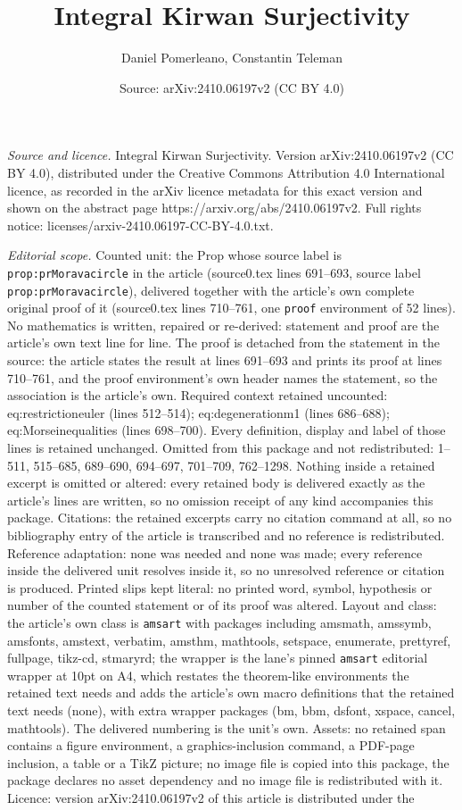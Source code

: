 \documentclass[10pt,a4paper]{amsart}
\title[Integral Kirwan Surjectivity]{Integral Kirwan Surjectivity}
\author{Daniel Pomerleano, Constantin Teleman}
\date{Source: arXiv:2410.06197v2 (CC BY 4.0)}
\begin{document}
\maketitle

\noindent\emph{Source and licence.} Integral Kirwan Surjectivity. Version arXiv:2410.06197v2 (CC BY 4.0), distributed under the Creative Commons Attribution 4.0 International licence, as recorded in the arXiv licence metadata for this exact version and shown on the abstract page https://arxiv.org/abs/2410.06197v2. Full rights notice: licenses/arxiv-2410.06197-CC-BY-4.0.txt.\par\smallskip

\noindent\textit{Editorial scope.} Counted unit: the Prop whose source label is \texttt{prop:prMoravacircle} in the article (source0.tex lines 691--693, source label \texttt{prop:prMoravacircle}), delivered together with the article's own complete original proof of it (source0.tex lines 710--761, one \texttt{proof} environment of 52 lines). No mathematics is written, repaired or re-derived: statement and proof are the article's own text line for line. The proof is detached from the statement in the source: the article states the result at lines 691--693 and prints its proof at lines 710--761, and the proof environment's own header names the statement, so the association is the article's own. Required context retained uncounted: eq:restrictioneuler (lines 512--514); eq:degenerationm1 (lines 686--688); eq:Morseinequalities (lines 698--700). Every definition, display and label of those lines is retained unchanged. Omitted from this package and not redistributed: 1--511, 515--685, 689--690, 694--697, 701--709, 762--1298. Nothing inside a retained excerpt is omitted or altered: every retained body is delivered exactly as the article's lines are written, so no omission receipt of any kind accompanies this package. Citations: the retained excerpts carry no citation command at all, so no bibliography entry of the article is transcribed and no reference is redistributed. Reference adaptation: none was needed and none was made; every reference inside the delivered unit resolves inside it, so no unresolved reference or citation is produced. Printed slips kept literal: no printed word, symbol, hypothesis or number of the counted statement or of its proof was altered. Layout and class: the article's own class is \texttt{amsart} with packages including amsmath, amssymb, amsfonts, amstext, verbatim, amsthm, mathtools, setspace, enumerate, prettyref, fullpage, tikz-cd, stmaryrd; the wrapper is the lane's pinned \texttt{amsart} editorial wrapper at 10pt on A4, which restates the theorem-like environments the retained text needs and adds the article's own macro definitions that the retained text needs (none), with extra wrapper packages (bm, bbm, dsfont, xspace, cancel, mathtools). The delivered numbering is the unit's own. Assets: no retained span contains a figure environment, a graphics-inclusion command, a PDF-page inclusion, a table or a TikZ picture; no image file is copied into this package, the package declares no asset dependency and no image file is redistributed with it. Licence: version arXiv:2410.06197v2 of this article is distributed under the 
\end{document}
